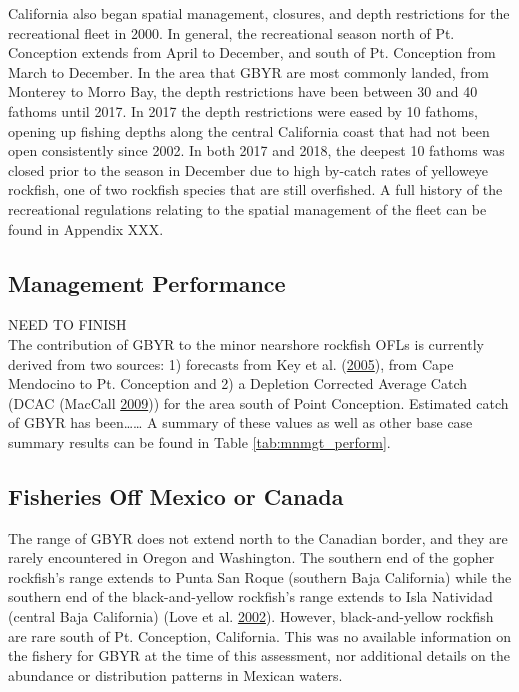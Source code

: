 \documentclass[12pt,]{article}
\begin{document}
California also began spatial management, closures, and depth
restrictions for the recreational fleet in 2000. In general, the
recreational season north of Pt. Conception extends from April to
December, and south of Pt. Conception from March to December. In the
area that GBYR are most commonly landed, from Monterey to Morro Bay, the
depth restrictions have been between 30 and 40 fathoms until 2017. In
2017 the depth restrictions were eased by 10 fathoms, opening up fishing
depths along the central California coast that had not been open
consistently since 2002. In both 2017 and 2018, the deepest 10 fathoms
was closed prior to the season in December due to high by-catch rates of
yelloweye rockfish, one of two rockfish species that are still
overfished. A full history of the recreational regulations relating to
the spatial management of the fleet can be found in Appendix XXX.

\subsection{Management Performance}\label{management-performance-1}

NEED TO FINISH\\
The contribution of GBYR to the minor nearshore rockfish OFLs is
currently derived from two sources: 1) forecasts from Key et al.
(\protect\hyperlink{ref-Key2005}{2005}), from Cape Mendocino to Pt.
Conception and 2) a Depletion Corrected Average Catch (DCAC (MacCall
\protect\hyperlink{ref-MacCall2009}{2009})) for the area south of Point
Conception. Estimated catch of GBYR has been\ldots{}\ldots{} A summary
of these values as well as other base case summary results can be found
in Table \ref{tab:mnmgt_perform}.

\subsection{Fisheries Off Mexico or
Canada}\label{fisheries-off-mexico-or-canada}

The range of GBYR does not extend north to the Canadian border, and they
are rarely encountered in Oregon and Washington. The southern end of the
gopher rockfish's range extends to Punta San Roque (southern Baja
California) while the southern end of the black-and-yellow rockfish's
range extends to Isla Natividad (central Baja California) (Love et al.
\protect\hyperlink{ref-Love2002}{2002}). However, black-and-yellow
rockfish are rare south of Pt. Conception, California. This was no
available information on the fishery for GBYR at the time of this
assessment, nor additional details on the abundance or distribution
patterns in Mexican waters.
\end{document}
